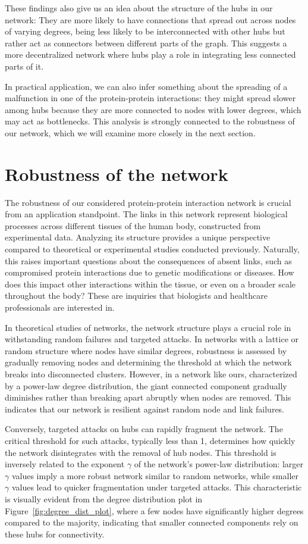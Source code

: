 \documentclass[paper=a4,fontsize=11pt,DIV=8,BCOR=5mm,oneside,pdftex,bibtotocnumbered]{scrreprt}
\theoremstyle{plain}
\begin{document}
	These findings also give us an idea about the structure of the hubs in our network: They are more likely to have connections that spread out across nodes of varying degrees, being less likely to be interconnected with other hubs but rather act as connectors between different parts of the graph. This suggests a more decentralized network where hubs play a role in integrating less connected parts of it.
	
	In practical application, we can also infer something about the spreading of a malfunction in one of the protein-protein interactions: they might spread slower among hubs because they are more connected to nodes with lower degrees, which may act as bottlenecks. This analysis is strongly connected to the robustness of our network, which we will examine more closely in the next section.
	
	\section{Robustness of the network}
	The robustness of our considered protein-protein interaction network is crucial from an application standpoint. The links in this network represent biological processes across different tissues of the human body, constructed from experimental data. Analyzing its structure provides a unique perspective compared to theoretical or experimental studies conducted previously. Naturally, this raises important questions about the consequences of absent links, such as compromised protein interactions due to genetic modifications or diseases. How does this impact other interactions within the tissue, or even on a broader scale throughout the body? These are inquiries that biologists and healthcare professionals are interested in.
	
	In theoretical studies of networks, the network structure plays a crucial role in withstanding random failures and targeted attacks. In networks with a lattice or random structure where nodes have similar degrees, robustness is assessed by gradually removing nodes and determining the threshold at which the network breaks into disconnected clusters. However, in a network like ours, characterized by a power-law degree distribution, the giant connected component gradually diminishes rather than breaking apart abruptly when nodes are removed. This indicates that our network is resilient against random node and link failures.
	
	Conversely, targeted attacks on hubs can rapidly fragment the network. The critical threshold for such attacks, typically less than 1, determines how quickly the network disintegrates with the removal of hub nodes. This threshold is inversely related to the exponent \(\gamma\) of the network's power-law distribution: larger \(\gamma\) values imply a more robust network similar to random networks, while smaller \(\gamma\) values lead to quicker fragmentation under targeted attacks. This characteristic is visually evident from the degree distribution plot in Figure~\ref{fig:degree_dist_plot}, where a few nodes have significantly higher degrees compared to the majority, indicating that smaller connected components rely on these hubs for connectivity.
	
\end{document}
